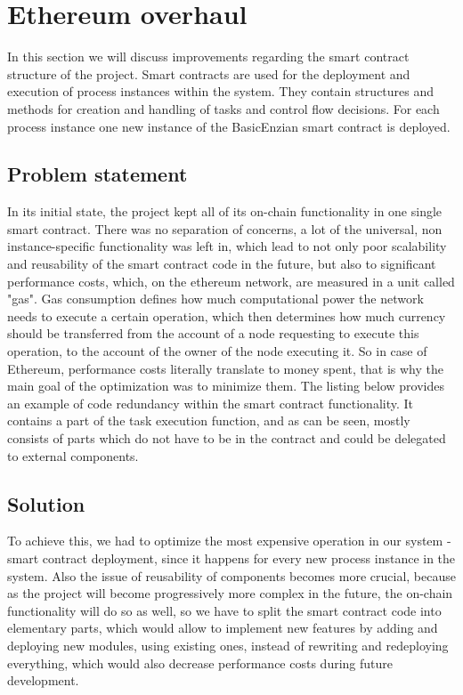 %
\section{Ethereum overhaul}
\label{sec:impr:eth}

In this section we will discuss improvements regarding the smart contract structure of the project. Smart contracts are used for the deployment and execution of process instances within the system. They contain structures and methods for creation and handling of tasks and control flow decisions. For each process instance one new instance of the BasicEnzian smart contract is deployed.

\subsection{Problem statement}
\label{sec:impr:eth:problem}

In its initial state, the project kept all of its on-chain functionality in one single smart contract. There was no separation of concerns, a lot of the universal, non instance-specific functionality was left in, which lead to not only poor scalability and reusability of the smart contract code in the future, but also to significant performance costs, which, on the ethereum network, are measured in a unit called "gas". Gas consumption defines how much computational power the network needs to execute a certain operation, which then determines how much currency should be transferred from the account of a node requesting to execute this operation, to the account of the owner of the node executing it. So in case of Ethereum, performance costs literally translate to money spent, that is why the main goal of the optimization was to minimize them. The listing below provides an example of code redundancy within the smart contract functionality. It contains a part of the task execution function, and as can be seen, mostly consists of parts which do not have to be in the contract and could be delegated to external components.

 

\subsection{Solution}
\label{sec:impr:eth:solution}

To achieve this, we had to optimize the most expensive operation in our system - smart contract deployment, since it happens for every new process instance in the system. Also the issue of reusability of components becomes more crucial, because as the project will become progressively more complex in the future, the on-chain functionality will do so as well, so we have to split the smart contract code into elementary parts, which would allow to implement new features by adding and deploying new modules, using existing ones, instead of rewriting and redeploying everything, which would also decrease performance costs during future development.

